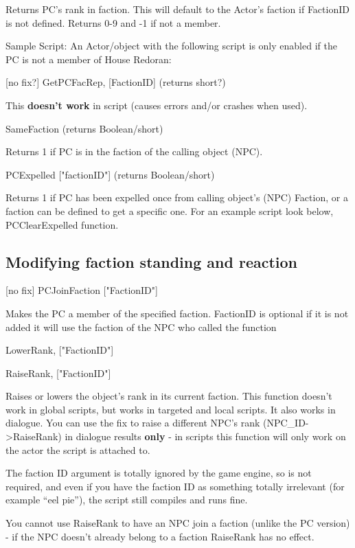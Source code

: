 \documentclass[
]{article}
\begin{document}
Returns PC's rank in faction. This will default to the Actor's faction
if FactionID is not defined. Returns 0-9 and -1 if not a member.

Sample Script: An Actor/object with the following script is only enabled
if the PC is not a member of House Redoran:



{[}no fix?{]} GetPCFacRep, {[}FactionID{]} (returns short?)

This \textbf{doesn't work} in script (causes errors and/or crashes when
used).

SameFaction (returns Boolean/short)

Returns 1 if PC is in the faction of the calling object (NPC).

PCExpelled {[}"factionID"{]} (returns Boolean/short)

Returns 1 if PC has been expelled once from calling object's (NPC)
Faction, or a faction can be defined to get a specific one. For an
example script look below, PCClearExpelled function.

\hypertarget{modifying-faction-standing-and-reaction}{%
\subsection{Modifying faction standing and
reaction}\label{modifying-faction-standing-and-reaction}}

{[}no fix{]} PCJoinFaction {[}"FactionID"{]}

Makes the PC a member of the specified faction. FactionID is optional if
it is not added it will use the faction of the NPC who called the
function

LowerRank, {[}"FactionID"{]}

RaiseRank, {[}"FactionID"{]}

Raises or lowers the object's rank in its current faction. This function
doesn't work in global scripts, but works in targeted and local scripts.
It also works in dialogue. You can use the fix to raise a different
NPC's rank (NPC\_ID-\textgreater RaiseRank) in dialogue results
\textbf{only} - in scripts this function will only work on the actor the
script is attached to.

The faction ID argument is totally ignored by the game engine, so is not
required, and even if you have the faction ID as something totally
irrelevant (for example ``eel pie''), the script still compiles and runs
fine.

You cannot use RaiseRank to have an NPC join a faction (unlike the PC
version) - if the NPC doesn't already belong to a faction RaiseRank has
no effect.
\end{document}

